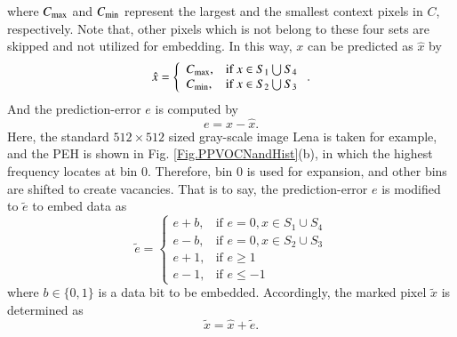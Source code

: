\documentclass[review,3p,10pt,sort&compress]{elsarticle}
\begin{document}
where $C_{\rm max}$ and $C_{\rm min}$ represent the largest and the smallest context pixels in $C$, respectively. Note that, other pixels which is not belong to these four sets are skipped and not utilized for embedding. In this way, $x$ can be predicted as $\hat{x}$ by
\begin{equation}\label{eq:xhat1}
    \hat{x} = \left\{\begin{array}{ll}
    C_{\rm max},  & \text{if } x \in S_1 \bigcup S_4 \\
    C_{\rm min},  & \text{if } x \in S_2 \bigcup S_3 
\end{array}\right.
.
\end{equation}
And the prediction-error $e$ is computed by
\begin{equation}\label{eq:PE}
e = x - \hat{x}.
\end{equation}
Here, the standard $512 \times 512$ sized gray-scale image Lena is taken for example, and the PEH is shown in Fig. \ref{Fig.PPVOCNandHist}(b), in which the highest frequency locates at bin 0. Therefore, bin 0 is used for expansion, and other bins are shifted to create vacancies. That is to say, the prediction-error $e$ is modified to $\tilde{e}$ to embed data as
\begin{equation}\label{eq:PPVOMPE}
    \tilde{e} = \left\{\begin{array}{ll}
    e + b,  & \text{if } e = 0, x \in S_1 \cup S_4 \\
    e - b,  & \text{if } e = 0, x \in S_2 \cup S_3 \\
    e + 1,  & \text{if } e \geq 1 \\
    e - 1,  & \text{if } e \leq -1
\end{array}\right.
\end{equation}
where $b \in \{0,1\}$ is a data bit to be embedded. Accordingly, the marked pixel $\tilde{x}$ is determined as
\begin{equation}\label{eq:PPVOMPixel}
    \tilde{x} = \hat{x} + \tilde{e}.
\end{equation}
\end{document}
